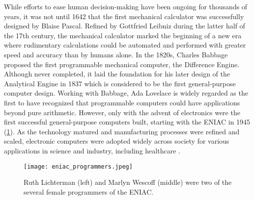 While efforts to ease human decision-making have been ongoing for thousands of years, it was not until 1642 that the first mechanical calculator was successfully designed by Blaise Pascal. Refined by Gottfried Leibniz during the latter half of the 17th century, the mechanical calculator marked the beginning of a new era where rudimentary calculations could be automated and performed with greater speed and accuracy than by humans alone. 
In the 1820s, Charles Babbage proposed the first programmable mechanical computer, the Difference Engine. Although never completed, it laid the foundation for his later design of the Analytical Engine in 1837 which is considered to be the first general-purpose computer design. 
Working with Babbage, Ada Lovelace is widely regarded as the first to have recognized that programmable computers could have applications beyond pure arithmetic. However, only with the advent of electronics were the first successful general-purpose computers built, starting with the ENIAC in 1945 (\cref{fig:eniac_programmers}).
As the technology matured and manufacturing processes were refined and scaled, electronic computers were adopted widely across society for various applications in science and industry, including healthcare \parencite{georges_universal_2001, harari_sapiens_2011}.

\begin{figure}[t]
    \centering
    \texttt{[image: eniac\_programmers.jpeg]}
    \caption[Ruth Lichterman (left) and Marlyn Wescoff (middle) were two of the several female programmers of the ENIAC, the world's first general-purpose electronic computer.]{ Ruth Lichterman (left) and Marlyn Wescoff (middle) were two of the several female programmers of the ENIAC. \parencite[photo credit][]{usarmyresearchlaboratoryarltechnicallibrary_female_1940}}
    \label{fig:eniac_programmers}
\end{figure}

